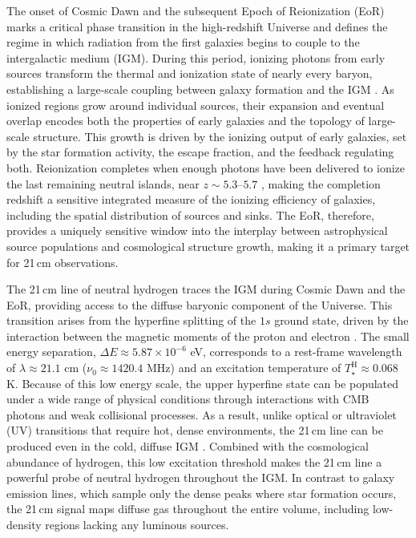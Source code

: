 \documentclass[apj,twocolumn, appendixfloats, twocolappendix, numberedappendix, tighten]{openjournal}
\begin{document}
The onset of Cosmic Dawn and the subsequent Epoch of Reionization (EoR) marks a critical phase transition in the high-redshift Universe and defines the regime in which radiation from the first galaxies begins to couple to the intergalactic medium (IGM). During this period, ionizing photons from early sources transform the thermal and ionization state of nearly every baryon, establishing a large-scale coupling between galaxy formation and the IGM \citep[see][for reviews]{Furlanetto2006, Pritchard2012, Mesinger2019}. As ionized regions grow around individual sources, their expansion and eventual overlap encodes both the properties of early galaxies and the topology of large-scale structure. This growth is driven by the ionizing output of early galaxies, set by the star formation activity, the escape fraction, and the feedback regulating both. Reionization completes when enough photons have been delivered to ionize the last remaining neutral islands, near $z \sim 5.3$--$5.7$ \citep{Planck2020, Bosman2022}, making the completion redshift a sensitive integrated measure of the ionizing efficiency of galaxies, including the spatial distribution of sources and sinks. The EoR, therefore, provides a uniquely sensitive window into the interplay between astrophysical source populations and cosmological structure growth, making it a primary target for 21\,cm observations.


The 21\,cm line of neutral hydrogen traces the IGM during Cosmic Dawn and the EoR, providing access to the diffuse baryonic component of the Universe. This transition arises from the hyperfine splitting of the $1s$ ground state, driven by the interaction between the magnetic moments of the proton and electron \citep[see, e.g.,][for reviews]{Furlanetto2006, Pritchard2012}. The small energy separation, $\Delta E \approx 5.87 \times 10^{-6}$ eV, corresponds to a rest-frame wavelength of $\lambda \approx 21.1$ cm ($\nu_0 \approx 1420.4$ MHz) and an excitation temperature of $T^\mathrm{H}_\star \approx 0.068$ K. Because of this low energy scale, the upper hyperfine state can be populated under a wide range of physical conditions through interactions with CMB photons and weak collisional processes. As a result, unlike optical or ultraviolet (UV) transitions that require hot, dense environments, the 21\,cm line can be produced even in the cold, diffuse IGM \citep[][]{Madau1997, Loeb2004}. Combined with the cosmological abundance of hydrogen, this low excitation threshold makes the 21\,cm line a powerful probe of neutral hydrogen throughout the IGM. In contrast to galaxy emission lines, which sample only the dense peaks where star formation occurs, the 21\,cm signal maps diffuse gas throughout the entire volume, including low-density regions lacking any luminous sources.
\end{document}
